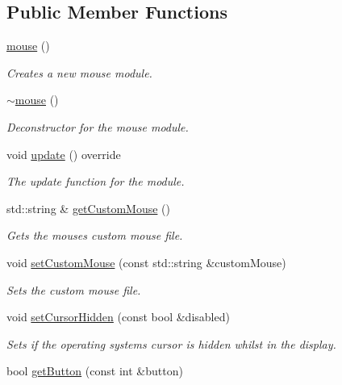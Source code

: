 \subsection*{Public Member Functions}
\begin{DoxyCompactItemize}
\item 
\hyperlink{classflounder_1_1mouse_a60e59355a55844e8ca559e2f6b9c82e9}{mouse} ()
\begin{DoxyCompactList}\small\item\em Creates a new mouse module. \end{DoxyCompactList}\item 
\hyperlink{classflounder_1_1mouse_a3038f39f358e37d15059af6c1675497b}{$\sim$mouse} ()
\begin{DoxyCompactList}\small\item\em Deconstructor for the mouse module. \end{DoxyCompactList}\item 
void \hyperlink{classflounder_1_1mouse_aa1b1d60e1d1cf4ec7d19eaef65e040bc}{update} () override
\begin{DoxyCompactList}\small\item\em The update function for the module. \end{DoxyCompactList}\item 
std\+::string \& \hyperlink{classflounder_1_1mouse_a43d0ec3660e698553e9c1f2f4403718e}{get\+Custom\+Mouse} ()
\begin{DoxyCompactList}\small\item\em Gets the mouses custom mouse file. \end{DoxyCompactList}\item 
void \hyperlink{classflounder_1_1mouse_ab6b1c2f498e6fdef0a2ff827ef93928a}{set\+Custom\+Mouse} (const std\+::string \&custom\+Mouse)
\begin{DoxyCompactList}\small\item\em Sets the custom mouse file. \end{DoxyCompactList}\item 
void \hyperlink{classflounder_1_1mouse_aff9750c7d68e93aea4c2d3c447677a9e}{set\+Cursor\+Hidden} (const bool \&disabled)
\begin{DoxyCompactList}\small\item\em Sets if the operating systems cursor is hidden whilst in the display. \end{DoxyCompactList}\item 
bool \hyperlink{classflounder_1_1mouse_a327552b319742adbb721733510f8a828}{get\+Button} (const int \&button)

\end{DoxyCompactItemize}
